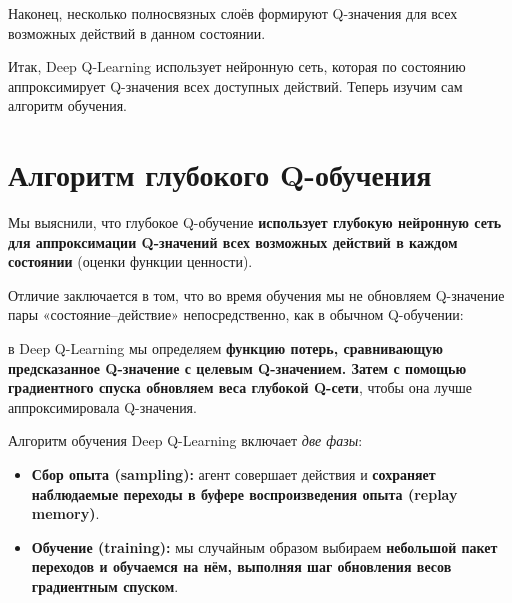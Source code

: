 \documentclass[11pt,a4paper]{article}
\begin{document}
Наконец, несколько полносвязных слоёв формируют Q-значения для всех возможных действий в данном состоянии.


Итак, Deep Q-Learning использует нейронную сеть, которая по состоянию аппроксимирует Q-значения всех доступных действий. Теперь изучим сам алгоритм обучения.

\section{Алгоритм глубокого Q-обучения}\label{the-deep-q-learning-algorithm}

Мы выяснили, что глубокое Q-обучение \textbf{использует глубокую нейронную сеть для аппроксимации Q-значений всех возможных действий в каждом состоянии} (оценки функции ценности).

Отличие заключается в том, что во время обучения мы не обновляем Q-значение пары «состояние--действие» непосредственно, как в обычном Q-обучении:


в Deep Q-Learning мы определяем \textbf{функцию потерь, сравнивающую предсказанное Q-значение с целевым Q-значением. Затем с помощью градиентного спуска обновляем веса глубокой Q-сети}, чтобы она лучше аппроксимировала Q-значения.


Алгоритм обучения Deep Q-Learning включает \emph{две фазы}:

\begin{itemize}
\tightlist
\item
\textbf{Сбор опыта (sampling):} агент совершает действия и \textbf{сохраняет наблюдаемые переходы в буфере воспроизведения опыта (replay memory)}.
\item
\textbf{Обучение (training):} мы случайным образом выбираем \textbf{небольшой пакет переходов и обучаемся на нём, выполняя шаг обновления весов градиентным спуском}.
\end{itemize}
\end{document}
